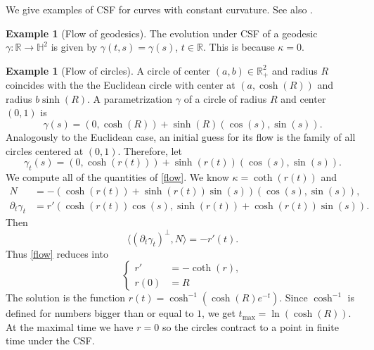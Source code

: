 \documentclass[12pt]{amsart}
\theoremstyle{plain}
\theoremstyle{definition}
\newtheorem{example}[theorem]{Example}
\def\h{\mathbb H}
\def\r{\mathbb R}
\begin{document}
  
 
We give examples of CSF for curves with constant curvature. See also \cite[p. 76--77]{gr}.


 
\begin{example}[Flow of geodesics]
The evolution under CSF of a geodesic $\gamma\colon \r \rightarrow \h^2$ is  given by $\gamma(t,s) = \gamma(s)$, $ t \in \r$. This is because $\kappa=0$.
\end{example}


\begin{example}[Flow of circles]
\label{ex:circle}A circle of  center     $(a,b) \in \r^2_+$ and radius $R$ coincides with the  the Euclidean circle with center at   $(a, \cosh(R))$ and radius   $b\sinh(R)$.  A parametrization $\gamma$ of 
  a circle of   radius $R$ and   center $(0,1)$  is 
$$\gamma(s)=(0,\cosh(R))+\sinh(R)\left(\cos(s),  \sin(s)\right).$$
 Analogously to the Euclidean case, an initial guess   for its flow is the family of all circles centered at $(0,1)$. Therefore, let 
 $$\gamma_t(s) =(0,  \cosh(r(t)) )+\sinh(r(t))(\cos(s), \sin(s)).$$ 
 We compute all of the quantities of \eqref{flow}. We know $\kappa=\coth(r(t))$ and 
 \begin{equation*}
 \begin{split}
 N&=-( \cosh(r(t)) + \sinh(r(t))\sin(s))(\cos(s),\sin(s)),\\
 \partial_t\gamma_t&=r'(\cosh(r(t))\cos(s),\sinh(r(t))+\cosh(r(t))\sin(s)).
 \end{split}
 \end{equation*}
  Then
 $$\langle( \partial_t\gamma_t)^\perp,N\rangle=-r'(t).$$
 Thus \eqref{flow} reduces into 
 \begin{equation*}
 \left\{
 \begin{split}
  r' &= -\coth(r),\\
   r(0) &= R \end{split}
   \right.
   \end{equation*}
    The solution   is the function $r(t) = \cosh^{-1}(\cosh(R)e^{-t})$.
    Since $\cosh^{-1}$ is defined for numbers  bigger than or equal to $1$, we get $t_{\text{max}} = \ln(\cosh(R))$. At the maximal time we have $r = 0$ so the circles contract to a point in finite time under the CSF.
\end{example} 
\end{document}
